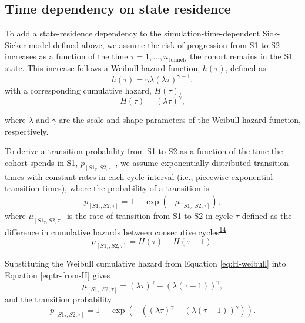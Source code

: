 \documentclass[
]{article}
\begin{document}
\hypertarget{time-dependency-on-state-residence-1}{%
\subsection{Time dependency on state residence}\label{time-dependency-on-state-residence-1}}

To add a state-residence dependency to the simulation-time-dependent Sick-Sicker model defined above, we assume the risk of progression from S1 to S2 increases as a function of the time \(\tau = 1, \ldots, n_{\text{tunnels}}\) the cohort remains in the S1 state. This increase follows a Weibull hazard function, \(h(\tau)\), defined as
\[
  h(\tau) = \gamma \lambda (\lambda \tau)^{\gamma-1},
\]
with a corresponding cumulative hazard, \(H(\tau)\),
\begin{equation}
  H(\tau) = (\lambda \tau)^{\gamma},
\label{eq:H-weibull}
\end{equation}

where \(\lambda\) and \(\gamma\) are the scale and shape parameters of the Weibull hazard function, respectively.

To derive a transition probability from S1 to S2 as a function of the time the cohort spends in S1, \(p_{\left[S1_{\tau},S2, \tau\right]}\), we assume exponentially distributed transition times with constant rates in each cycle interval (i.e., piecewise exponential transition times), where the probability of a transition is
\begin{equation}
  p_{\left[S1_{\tau},S2, \tau\right]} = 1-\exp{\left(-\mu_{\left[S1_{\tau},S2, \tau\right]}\right)},
\label{eq:tp-from-rate}
\end{equation}
where \(\mu_{\left[S1_{\tau},S2, \tau\right]}\) is the rate of transition from S1 to S2 in cycle \(\tau\) defined as the difference in cumulative hazards between consecutive cycles\textsuperscript{\protect\hyperlink{ref-Diaby2014}{14}}
\begin{equation}
  \mu_{\left[S1_{\tau},S2, \tau\right]} = H(\tau) - H(\tau-1).
\label{eq:tr-from-H}
\end{equation}

Substituting the Weibull cumulative hazard from Equation \eqref{eq:H-weibull} into Equation \eqref{eq:tr-from-H} gives
\begin{equation}
  \mu_{\left[S1_{\tau},S2, \tau\right]} = (\lambda \tau)^{\gamma} - (\lambda (\tau-1))^{\gamma},
\label{eq:tr-from-H-weibull}
\end{equation}
and the transition probability
\begin{equation}
  p_{\left[S1_{\tau},S2, \tau\right]} = 1-\exp{\left(- \left((\lambda \tau)^{\gamma} - (\lambda (\tau-1))^{\gamma}\right) \right)}.
\label{eq:tp-from-H-weibull}
\end{equation}
\end{document}
